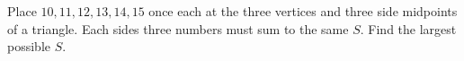 Place $10,11,12,13,14,15$ once each at the three vertices and three side midpoints of a triangle. Each side\textquotesingle s three numbers must sum to the same $S$. Find the largest possible $S$.
